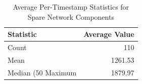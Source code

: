 \begin{table}[htbp]
\centering
\caption{Average Per-Timestamp Statistics for Spare Network Components}
\label{tab:contiguity_component_size}
\begin{tabular}{lr}
\toprule
Statistic & Average Value \\
\midrule
Count & 110 \\
Mean & 1261.53 \\
Median (50%
Maximum & 1879.97 \\
\bottomrule
\end{tabular}
\end{table}
